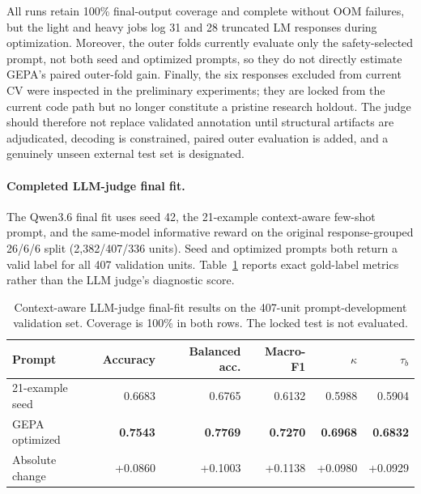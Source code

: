 All runs retain 100\% final-output coverage and complete without OOM failures,
but the light and heavy jobs log 31 and 28 truncated LM responses during
optimization.  Moreover, the outer folds currently evaluate only the
safety-selected prompt, not both seed and optimized prompts, so they do not
directly estimate GEPA's paired outer-fold gain.  Finally, the six responses
excluded from current CV were inspected in the preliminary experiments; they
are locked from the current code path but no longer constitute a pristine
research holdout.  The judge should therefore not replace validated annotation
until structural artifacts are adjudicated, decoding is constrained, paired
outer evaluation is added, and a genuinely unseen external test set is
designated.

\paragraph{Completed LLM-judge final fit.}
The Qwen3.6 final fit uses seed 42, the 21-example context-aware few-shot
prompt, and the same-model informative reward on the original response-grouped
26/6/6 split (2,382/407/336 units).  Seed and optimized prompts both return a
valid label for all 407 validation units.  Table~\ref{tab:exp0a-llmjudge}
reports exact gold-label metrics rather than the LLM judge's diagnostic score.

\begin{table}[t]
\centering
\caption{Context-aware LLM-judge final-fit results on the 407-unit
prompt-development validation set.  Coverage is 100\% in both rows.  The locked test
is not evaluated.  }
\label{tab:exp0a-llmjudge}
\begin{tabular}{lrrrrr}
\toprule
Prompt & Accuracy & Balanced acc. & Macro-F1 & $\kappa$ & $\tau_b$ \\
\midrule
21-example seed & 0.6683 & 0.6765 & 0.6132 & 0.5988 & 0.5904 \\
GEPA optimized  & \textbf{0.7543} & \textbf{0.7769} & \textbf{0.7270} &
\textbf{0.6968} & \textbf{0.6832} \\
\midrule
Absolute change & +0.0860 & +0.1003 & +0.1138 & +0.0980 & +0.0929 \\
\bottomrule
\end{tabular}
\end{table}

